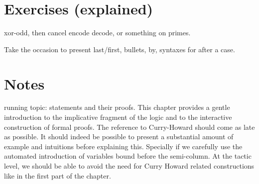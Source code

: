 \section{Exercises (explained)}

xor-odd, then cancel encode decode, or something on primes.

Take the occasion to present last/first, bullets, by, syntaxes for
\C{=> [|IH x xs]} after a case.


\section{Notes}

%
%
%

running topic: statements and their proofs. This chapter provides a gentle
introduction to the implicative fragment of the logic and to the
interactive construction of formal proofs. The reference to
Curry-Howard should come as late as possible. It should indeed be
possible to present a substantial amount of example and intuitions
before explaining this. Specially if we carefully use the automated
introduction of variables bound before the semi-column. At the tactic
level, we should be able to avoid the need for Curry Howard related
constructions like  in the first part of the chapter.

